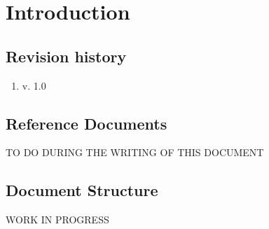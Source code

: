 \documentclass[../rasd.tex]{subfiles}
\begin{document}
\chapter{Introduction}
		
		
		
		
	
		\section{Revision history}
		\begin{enumerate}
			\item v. 1.0
		\end{enumerate}
		\section{Reference Documents}
		TO DO DURING THE WRITING OF THIS DOCUMENT
		\section{Document Structure}
		WORK IN PROGRESS
		
\end{document}
